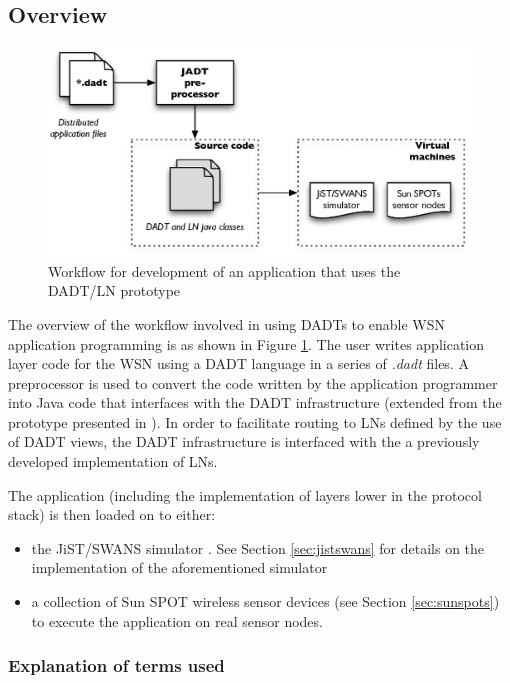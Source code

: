 \subsection{Overview}
\begin{figure}
\centering
\includegraphics[width=\textwidth]{img/DADTLN_architecture.eps} 
\caption[DADT/LN application workflow]{Workflow for development of an application that uses
the DADT/LN prototype}
\label{Fig:DADTLN_architecture}
\end{figure} 
The overview of the workflow involved in using DADTs to enable WSN application
programming is as shown in Figure \ref{Fig:DADTLN_architecture}. The user writes
application layer code for the WSN using a DADT language in a series of
\emph{.dadt} files. A preprocessor is used to convert the code written by the
application programmer into Java code that interfaces with the DADT
infrastructure (extended from the prototype presented in
\cite{migliavacca_DADT:2006}). In order to facilitate routing to LNs defined by
the use of DADT views, the DADT infrastructure is interfaced with the a
previously developed implementation of LNs. 

The application (including the implementation of layers lower in the protocol
stack) is then loaded on to either:
\begin{itemize}
\item the JiST/SWANS simulator \cite{barr_JIST:2005, barr_SWANS}. See Section \ref{sec:jistswans} for details on the implementation of
the aforementioned simulator
\item a collection of Sun SPOT wireless sensor devices \cite{simon_squawk:2006}
(see Section \ref{sec:sunspots}) to execute the application on real sensor nodes.
\end{itemize}

\subsubsection{Explanation of terms used}

